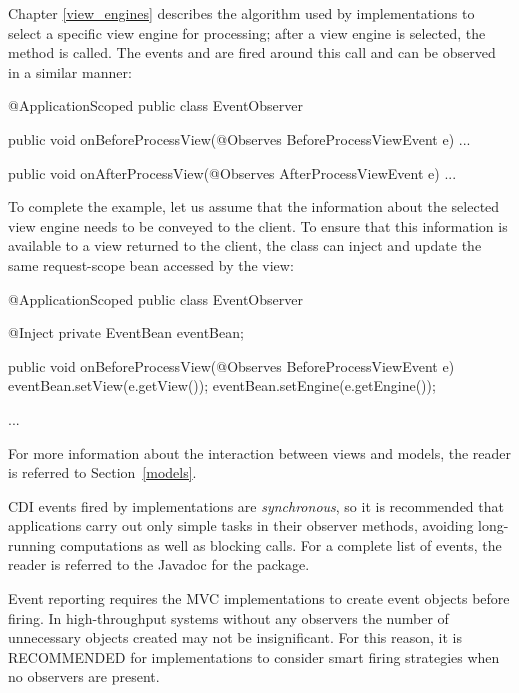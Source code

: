 Chapter \ref{view_engines} describes the algorithm used by implementations to select a
specific view engine for processing; after a view engine is selected, the method
 is called. The events 
and  are fired around this call and can be observed
in a similar manner:

\begin{listing}{1}
@ApplicationScoped
public class EventObserver {

    public void onBeforeProcessView(@Observes BeforeProcessViewEvent e) {
        ...
    }
    
    public void onAfterProcessView(@Observes AfterProcessViewEvent e) {
        ...
    }
}
\end{listing}

To complete the example, let us assume that the information about the selected
view engine needs to be conveyed to the client. To ensure that this information
is available to a view returned to the client, the  class
can inject and update the same request-scope bean accessed by the view:

\begin{listing}{1}
@ApplicationScoped
public class EventObserver {

    @Inject
    private EventBean eventBean;

    public void onBeforeProcessView(@Observes BeforeProcessViewEvent e) {
        eventBean.setView(e.getView());
        eventBean.setEngine(e.getEngine());
    }
    
    ...
}
\end{listing}

For more information about the interaction between views and models, the reader
is referred to Section~\ref{models}. 

CDI events fired by implementations are {\em synchronous},
so it is recommended that applications carry out only simple tasks in 
their observer methods, avoiding long-running computations as well as blocking calls.
For a complete list of events, the reader is referred to the Javadoc for the 
 package.

Event reporting requires the MVC implementations to create event objects before
firing. In high-throughput systems without any observers the number of unnecessary
objects created may not be insignificant. For this reason, it is RECOMMENDED
for implementations to consider smart firing strategies when no observers
are present.


